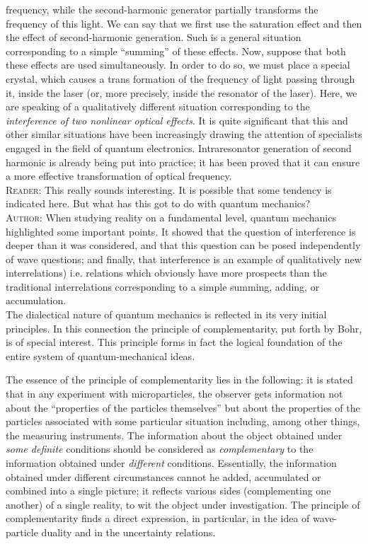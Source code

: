 \documentclass[a4paper,sfsidenotes,colorlinks=true]{tufte-book}
\numberwithin{equation}{section}
\numberwithin{figure}{section}
\begin{document}
frequency, while the second-harmonic generator partially transforms
the frequency of this light. We can say that we first use the
saturation effect and then the effect of second-harmonic
generation. Such is a general situation corresponding to a simple
``summing'' of these effects. Now, suppose that both these effects are
used simultaneously. In order to do so, we must place a special
crystal, which causes a trans formation of the frequency of light
passing through it, inside the laser (or, more precisely, inside the
resonator of the laser). Here, we are speaking of a qualitatively
different situation corresponding to the \emph{interference of two nonlinear
optical effects}. It is quite significant that this and other similar
situations have been increasingly drawing the attention of specialists
engaged in the field of quantum electronics. Intraresonator
generation of second harmonic is already being put into practice; it
has been proved that it can ensure a more effective transformation of
optical frequency.\\
\textsc{Reader:} This really sounds interesting. It is possible that
some tendency is indicated here. But what has this got to do with
quantum mechanics?\\

\textsc{Author:} When studying reality on a fundamental level, quantum
mechanics highlighted some important points. It showed that the
question of interference is deeper than it was considered, and that
this question can be posed independently of wave questions; and
finally, that interference is an example of qualitatively new
interrelations) i.e. relations which obviously have more prospects
than the traditional interrelations corresponding to a simple
summing, adding, or accumulation.\\[10pt]


The  dialectical nature of quantum
mechanics is reflected in its very initial principles. In this
connection the principle of complementarity, put forth by Bohr, is of
special interest. This principle forms in fact the logical foundation of the entire system of quantum-mechanical ideas.

The essence of the principle of complementarity lies in the following:
it is stated that in any experiment with microparticles, the observer
gets information not about the ``properties of the particles
themselves'' but about the properties of the particles associated with
some particular situation including, among other things, the measuring
instruments. The information about the object obtained under
\emph{some definite} conditions should be considered as
\emph{complementary} to the information obtained under
\emph{different} conditions. Essentially, the information obtained
under different circumstances cannot he added, accumulated or
combined into a single picture; it reflects various sides
(complementing one another) of a single reality, to wit the object
under investigation. The principle of complementarity finds a direct
expression, in particular, in the idea of wave-particle duality and in
the uncertainty relations.
\end{document}
